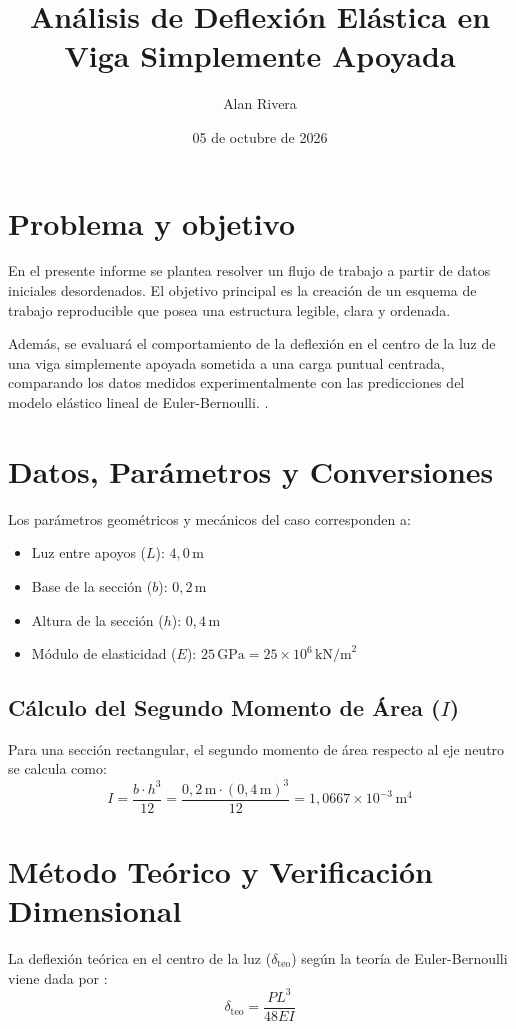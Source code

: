 \documentclass[11pt,a4paper]{article}
\title{\textbf{Análisis de Deflexión Elástica en Viga Simplemente Apoyada}}
\author{Alan Rivera}
\date{05 de octubre de 2026}
\begin{document}
\maketitle

\section*{Problema y objetivo}

En el presente informe se plantea resolver un flujo de trabajo a partir de datos iniciales desordenados. El objetivo principal es la creación de un esquema de trabajo reproducible que posea una estructura legible, clara y ordenada.

Además, se evaluará el comportamiento de la deflexión en el centro de la luz de una viga simplemente apoyada sometida a una carga puntual centrada, comparando los datos medidos experimentalmente con las predicciones del modelo elástico lineal de Euler-Bernoulli. \cite{hibbeler2017}.

\section{Datos, Parámetros y Conversiones}
Los parámetros geométricos y mecánicos del caso corresponden a:
\begin{itemize}
    \item Luz entre apoyos ($L$): $4{,}0\,\text{m}$
    \item Base de la sección ($b$): $0{,}2\,\text{m}$
    \item Altura de la sección ($h$): $0{,}4\,\text{m}$
    \item Módulo de elasticidad ($E$): $25\,\text{GPa} = 25 \times 10^6\,\text{kN/m}^2$
\end{itemize}

\subsection{Cálculo del Segundo Momento de Área ($I$)}
Para una sección rectangular, el segundo momento de área respecto al eje neutro se calcula como:
\begin{equation}
I = \frac{b \cdot h^3}{12} = \frac{0{,}2\,\text{m} \cdot (0{,}4\,\text{m})^3}{12} = 1{,}0667 \times 10^{-3}\,\text{m}^4
\end{equation}

\section{Método Teórico y Verificación Dimensional}
La deflexión teórica en el centro de la luz ($\delta_{\text{teo}}$) según la teoría de Euler-Bernoulli viene dada por \cite{timoshenko1975}:
\begin{equation}
\delta_{\text{teo}} = \frac{P L^3}{48 E I}
\end{equation}
\end{document}
